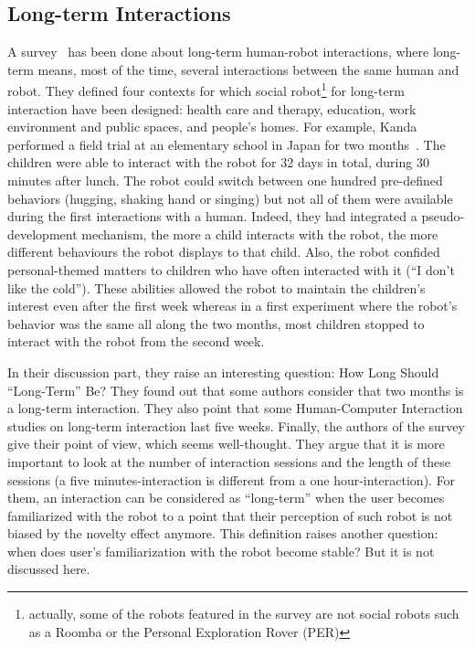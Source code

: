\documentclass[a4paper,11pt,twoside]{StyleThese}
\begin{document}
\subsection{Long-term Interactions}
A survey~\cite{leite_2013_social} has been done about long-term human-robot interactions, where long-term means, most of the time, several interactions between the same human and robot. They defined four contexts for which social robot\footnote{actually, some of the robots featured in the survey are not social robots such as a Roomba or the Personal Exploration Rover (PER)} for long-term interaction have been designed: health care and therapy, education, work environment and public spaces, and people's homes. 
For example, Kanda \etal performed a field trial at an elementary school in Japan for two months~\cite{kanda_2007_two}. The children were able to interact with the robot for 32 days in total, during 30 minutes after lunch. The robot could switch between one hundred pre-defined behaviors (\eg hugging, shaking hand or singing) but not all of them were available during the first interactions with a human. Indeed, they had integrated a pseudo-development mechanism, \ie the more a child interacts with the robot, the more different behaviours the robot displays to that child. Also, the robot confided personal-themed matters to children who have often interacted with it (\eg ``I don't like the cold''). These abilities allowed the robot to maintain the children's interest even after the first week whereas in a first experiment where the robot's behavior was the same all along the two months, most children stopped to interact with the robot from the second week. 

In their discussion part, they raise an interesting question: How Long Should ``Long-Term'' Be? They found out that some authors consider that two months is a long-term interaction. They also point that some Human-Computer Interaction studies on long-term interaction last five weeks. Finally, the authors of the survey give their point of view, which seems well-thought. They argue that it is more important to look at the number of interaction sessions and the length of these sessions (a five minutes-interaction is different from a one hour-interaction). For them, an interaction can be considered as ``long-term'' when the user becomes familiarized with the robot to a point that their perception of such robot is not biased by the novelty effect anymore. This definition raises another question: when does user’s familiarization with the robot become stable? But it is not discussed here.
\end{document}
